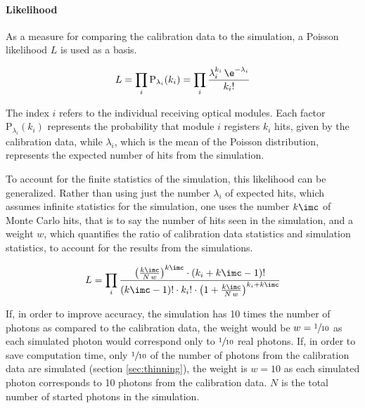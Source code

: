 \paragraph{Likelihood}
As a measure for comparing the calibration data to the simulation, a Poisson likelihood $L$ is used as a basis.

\begin{equation}
  L = \prod_{i} \text{P}_{\lambda_i}(k_i) = \prod_{i} \frac{\lambda_i^{k_i}\,\e^{-\lambda_i}}{k_i !}
\end{equation}

The index $i$ refers to the individual receiving optical modules. Each factor $\text{P}_{\lambda_i}(k_i)$ represents the probability that module $i$ registers $k_i$ hits, given by the calibration data, while $\lambda_i$, which is the mean of the Poisson distribution, represents the expected number of hits from the simulation.

%
%

To account for the finite statistics of the simulation, this likelihood can be generalized. Rather than using just the number $\lambda_i$ of expected hits, which assumes infinite statistics for the simulation, one uses the number $k\imc$ of Monte Carlo hits, that is to say the number of hits seen in the simulation, and a weight $w$, which quantifies the ratio of calibration data statistics and simulation statistics, to account for the results from the simulations. \cite[equation 21]{Gluesenkamp2018}

\begin{equation}
  L = \prod_{i} \frac%
    {\left(\frac{k\imc}{N\,w}\right)^{k\imc} \cdot \left(k_i + k\imc - 1\right)!}%
    {(k\imc - 1)! \cdot k_i! \cdot \left( 1 + \frac{k\imc}{N\,w} \right)^{k_i + k\imc}}
\end{equation}

If, in order to improve accuracy, the simulation has 10 times the number of photons as compared to the calibration data, the weight would be $w=\sfrac{1}{10}$ as each simulated photon would correspond only to $\sfrac{1}{10}$ real photons. If, in order to save computation time, only $\sfrac{1}{10}$ of the number of photons from the calibration data are simulated (section \ref{sec:thinning}), the weight is $w=10$ as each simulated photon corresponds to 10 photons from the calibration data. $N$ is the total number of started photons in the simulation.


